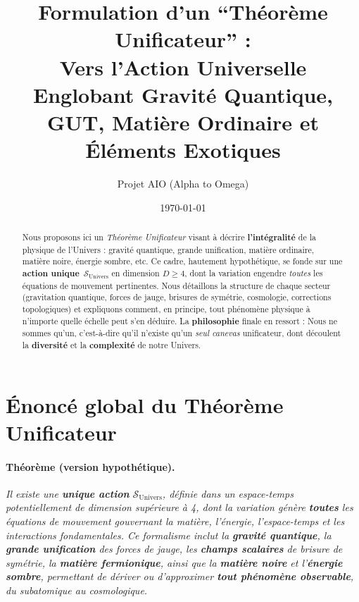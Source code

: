 \documentclass[12pt]{article}
\title{\textbf{Formulation d'un ``Théorème Unificateur'' :}\\
Vers l'Action Universelle Englobant Gravité Quantique, GUT, Matière Ordinaire et Éléments Exotiques}
\author{Projet AIO (Alpha to Omega)}
\date{\today}
\begin{document}
\maketitle

\begin{abstract}
Nous proposons ici un \emph{Théorème Unificateur} visant à décrire \textbf{l'intégralité} 
de la physique de l'Univers : gravité quantique, grande unification, matière ordinaire, 
matière noire, énergie sombre, etc. 
Ce cadre, hautement hypothétique, se fonde sur une \textbf{action unique} 
\(\,\mathcal{S}_{\text{Univers}}\) en dimension \(D \ge 4\), dont la variation engendre 
\emph{toutes} les équations de mouvement pertinentes. 
Nous détaillons la structure de chaque secteur (gravitation quantique, forces de jauge, 
brisures de symétrie, cosmologie, corrections topologiques) et expliquons comment, 
en principe, tout phénomène physique à n'importe quelle échelle peut s'en déduire. 
La \textbf{philosophie} finale en ressort : \og Nous ne sommes qu'un\fg, 
c'est-à-dire qu'il n'existe qu'un \emph{seul canevas} unificateur, 
dont découlent la \textbf{diversité} et la \textbf{complexité} de notre Univers.
\end{abstract}

\tableofcontents

\section{Énoncé global du Théorème Unificateur}
\label{sec:theoreme}

\paragraph{Théorème (version hypothétique).} 
\emph{Il existe une \textbf{unique action} \(\mathcal{S}_{\text{Univers}}\), définie 
dans un espace-temps potentiellement de dimension supérieure à 4, 
dont la variation génère \textbf{toutes} les équations de mouvement 
gouvernant la matière, l'énergie, l'espace-temps et les interactions fondamentales. 
Ce formalisme inclut la \textbf{gravité quantique}, 
la \textbf{grande unification} des forces de jauge, 
les \textbf{champs scalaires} de brisure de symétrie, 
la \textbf{matière fermionique}, 
ainsi que la \textbf{matière noire} et l'\textbf{énergie sombre}, 
permettant de dériver ou d'approximer \textbf{tout phénomène observable}, 
du subatomique au cosmologique.}

\vspace{1em}
\end{document}

